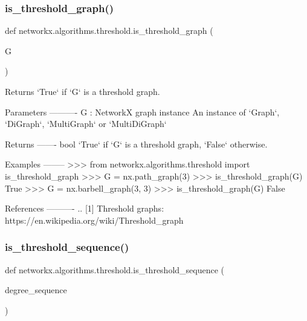 \subsubsection{\texorpdfstring{is\+\_\+threshold\+\_\+graph()}{is\_threshold\_graph()}}
{\footnotesize\ttfamily def networkx.\+algorithms.\+threshold.\+is\+\_\+threshold\+\_\+graph (\begin{DoxyParamCaption}\item[{}]{G }\end{DoxyParamCaption})}

\begin{DoxyVerb}Returns `True` if `G` is a threshold graph.

Parameters
----------
G : NetworkX graph instance
    An instance of `Graph`, `DiGraph`, `MultiGraph` or `MultiDiGraph`

Returns
-------
bool
    `True` if `G` is a threshold graph, `False` otherwise.

Examples
--------
>>> from networkx.algorithms.threshold import is_threshold_graph
>>> G = nx.path_graph(3)
>>> is_threshold_graph(G)
True
>>> G = nx.barbell_graph(3, 3)
>>> is_threshold_graph(G)
False

References
----------
.. [1] Threshold graphs: https://en.wikipedia.org/wiki/Threshold_graph
\end{DoxyVerb}
 \mbox{\label{namespacenetworkx_1_1algorithms_1_1threshold_a3941fdbefea9aefa8625b4b642156145}} 
\subsubsection{\texorpdfstring{is\+\_\+threshold\+\_\+sequence()}{is\_threshold\_sequence()}}
{\footnotesize\ttfamily def networkx.\+algorithms.\+threshold.\+is\+\_\+threshold\+\_\+sequence (\begin{DoxyParamCaption}\item[{}]{degree\+\_\+sequence }\end{DoxyParamCaption})}

